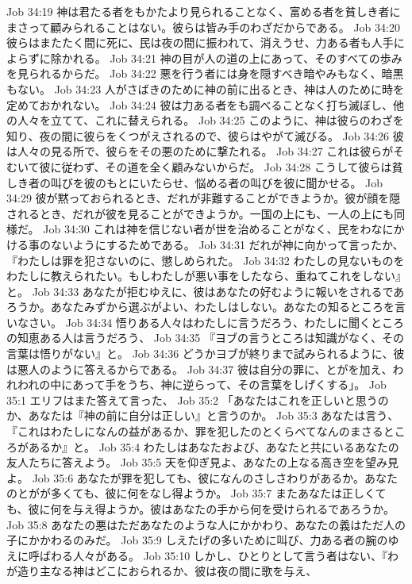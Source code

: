 Job 34:19  神は君たる者をもかたより見られることなく、富める者を貧しき者にまさって顧みられることはない。彼らは皆み手のわざだからである。
Job 34:20  彼らはまたたく間に死に、民は夜の間に振われて、消えうせ、力ある者も人手によらずに除かれる。
Job 34:21  神の目が人の道の上にあって、そのすべての歩みを見られるからだ。
Job 34:22  悪を行う者には身を隠すべき暗やみもなく、暗黒もない。
Job 34:23  人がさばきのために神の前に出るとき、神は人のために時を定めておかれない。
Job 34:24  彼は力ある者をも調べることなく打ち滅ぼし、他の人々を立てて、これに替えられる。
Job 34:25  このように、神は彼らのわざを知り、夜の間に彼らをくつがえされるので、彼らはやがて滅びる。
Job 34:26  彼は人々の見る所で、彼らをその悪のために撃たれる。
Job 34:27  これは彼らがそむいて彼に従わず、その道を全く顧みないからだ。
Job 34:28  こうして彼らは貧しき者の叫びを彼のもとにいたらせ、悩める者の叫びを彼に聞かせる。
Job 34:29  彼が黙っておられるとき、だれが非難することができようか。彼が顔を隠されるとき、だれが彼を見ることができようか。一国の上にも、一人の上にも同様だ。
Job 34:30  これは神を信じない者が世を治めることがなく、民をわなにかける事のないようにするためである。
Job 34:31  だれが神に向かって言ったか、『わたしは罪を犯さないのに、懲しめられた。
Job 34:32  わたしの見ないものをわたしに教えられたい。もしわたしが悪い事をしたなら、重ねてこれをしない』と。
Job 34:33  あなたが拒むゆえに、彼はあなたの好むように報いをされるであろうか。あなたみずから選ぶがよい、わたしはしない。あなたの知るところを言いなさい。
Job 34:34  悟りある人々はわたしに言うだろう、わたしに聞くところの知恵ある人は言うだろう、
Job 34:35  『ヨブの言うところは知識がなく、その言葉は悟りがない』と。
Job 34:36  どうかヨブが終りまで試みられるように、彼は悪人のように答えるからである。
Job 34:37  彼は自分の罪に、とがを加え、われわれの中にあって手をうち、神に逆らって、その言葉をしげくする」。
Job 35:1  エリフはまた答えて言った、
Job 35:2  「あなたはこれを正しいと思うのか、あなたは『神の前に自分は正しい』と言うのか。
Job 35:3  あなたは言う、『これはわたしになんの益があるか、罪を犯したのとくらべてなんのまさるところがあるか』と。
Job 35:4  わたしはあなたおよび、あなたと共にいるあなたの友人たちに答えよう。
Job 35:5  天を仰ぎ見よ、あなたの上なる高き空を望み見よ。
Job 35:6  あなたが罪を犯しても、彼になんのさしさわりがあるか。あなたのとがが多くても、彼に何をなし得ようか。
Job 35:7  またあなたは正しくても、彼に何を与え得ようか。彼はあなたの手から何を受けられるであろうか。
Job 35:8  あなたの悪はただあなたのような人にかかわり、あなたの義はただ人の子にかかわるのみだ。
Job 35:9  しえたげの多いために叫び、力ある者の腕のゆえに呼ばわる人々がある。
Job 35:10  しかし、ひとりとして言う者はない、『わが造り主なる神はどこにおられるか、彼は夜の間に歌を与え、
